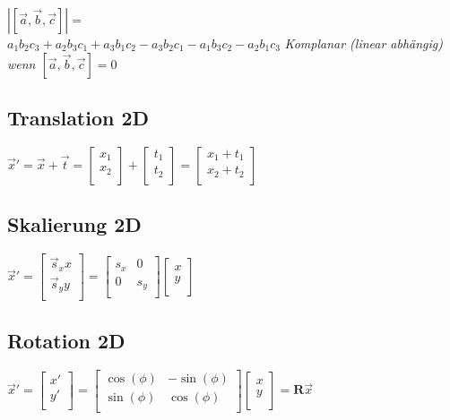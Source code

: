 $|[\vec{a}, \vec{b}, \vec{c}]| = $ \\
$a_1 b_2 c_3 + a_2 b_3 c_1 + a_3 b_1 c_2 - a_3 b_2 c_1 - a_1 b_3 c_2 - a_2 b_1 c_3$
\textit{Komplanar (linear abhängig) wenn $[\vec{a}, \vec{b}, \vec{c}] = 0$}

\subsection{Translation 2D}

$\vec{x}' = \vec{x} + \vec{t} = \begin{bmatrix}
    x_1 \\
    x_2 \\
\end{bmatrix} + \begin{bmatrix}
    t_1 \\
    t_2 \\
\end{bmatrix} = \begin{bmatrix}
    x_1 + t_1 \\
    x_2 + t_2 \\
\end{bmatrix}$

\subsection{Skalierung 2D}

$\vec{x}' = \begin{bmatrix}
    \vec{s}_x x \\
    \vec{s}_y y \\
\end{bmatrix} = \begin{bmatrix}
    s_x & 0 \\
    0 & s_y \\
\end{bmatrix} \begin{bmatrix}
    x \\
    y \\
\end{bmatrix}$

\subsection{Rotation 2D}

$\vec{x}' = \begin{bmatrix}
    x' \\
    y' \\
\end{bmatrix} = \begin{bmatrix}
    \cos(\phi) & -\sin(\phi) \\
    \sin(\phi) & \cos(\phi) \\
\end{bmatrix} \begin{bmatrix}
    x \\
    y \\
\end{bmatrix} = \mathbf{R}\vec{x}$

